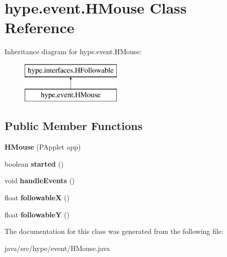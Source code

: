\hypertarget{classhype_1_1event_1_1_h_mouse}{\section{hype.\-event.\-H\-Mouse Class Reference}
\label{classhype_1_1event_1_1_h_mouse}
}
Inheritance diagram for hype.\-event.\-H\-Mouse\-:\begin{figure}[H]
\begin{center}
\leavevmode
\includegraphics[height=2.000000cm]{classhype_1_1event_1_1_h_mouse}
\end{center}
\end{figure}
\subsection*{Public Member Functions}
\begin{DoxyCompactItemize}
\item 
\hypertarget{classhype_1_1event_1_1_h_mouse_a0ac8e5d2ccc6c12a7b1e05a6c42d94d1}{{\bfseries H\-Mouse} (P\-Applet app)}\label{classhype_1_1event_1_1_h_mouse_a0ac8e5d2ccc6c12a7b1e05a6c42d94d1}

\item 
\hypertarget{classhype_1_1event_1_1_h_mouse_ac573179fd6a317b9655c5c85f35ad682}{boolean {\bfseries started} ()}\label{classhype_1_1event_1_1_h_mouse_ac573179fd6a317b9655c5c85f35ad682}

\item 
\hypertarget{classhype_1_1event_1_1_h_mouse_abb6b90eddc9ed4c5c572f06cb47cf02d}{void {\bfseries handle\-Events} ()}\label{classhype_1_1event_1_1_h_mouse_abb6b90eddc9ed4c5c572f06cb47cf02d}

\item 
\hypertarget{classhype_1_1event_1_1_h_mouse_a7f632f67d52734907f2108962c99e23a}{float {\bfseries followable\-X} ()}\label{classhype_1_1event_1_1_h_mouse_a7f632f67d52734907f2108962c99e23a}

\item 
\hypertarget{classhype_1_1event_1_1_h_mouse_a965d7b2a730f6c07fac88dcaa4670c10}{float {\bfseries followable\-Y} ()}\label{classhype_1_1event_1_1_h_mouse_a965d7b2a730f6c07fac88dcaa4670c10}

\end{DoxyCompactItemize}


The documentation for this class was generated from the following file\-:\begin{DoxyCompactItemize}
\item 
java/src/hype/event/H\-Mouse.\-java\end{DoxyCompactItemize}
